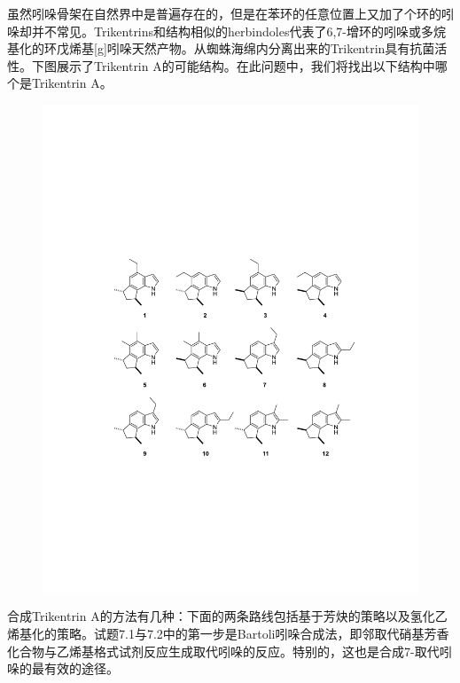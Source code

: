 虽然吲哚骨架在自然界中是普遍存在的，但是在苯环的任意位置上又加了个环的吲哚却并不常见。Trikentrins和结构相似的herbindoles代表了6,7-增环的吲哚或多烷基化的环戊烯基{[}g{]}吲哚天然产物。从蜘蛛海绵内分离出来的Trikentrin具有抗菌活性。下图展示了Trikentrin
A的可能结构。在此问题中，我们将找出以下结构中哪个是Trikentrin A。

\begin{figure}[h]
	\centering
	\includegraphics[width=14cm]{./pic/t7-1.pdf}
\end{figure}

合成Trikentrin
A的方法有几种：下面的两条路线包括基于芳炔的策略以及氢化乙烯基化的策略。试题7.1与7.2中的第一步是Bartoli吲哚合成法，即邻取代硝基芳香化合物与乙烯基格式试剂反应生成取代吲哚的反应。特别的，这也是合成7-取代吲哚的最有效的途径。

